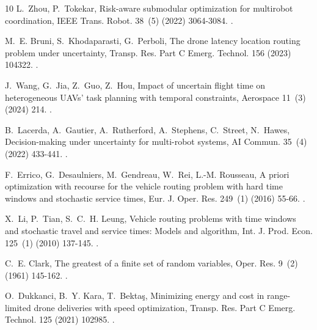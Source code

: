 \documentclass[a4paper,fleqn]{cas-dc}
\begin{document}
\begin{thebibliography}{10}
L.~Zhou, P.~Tokekar, Risk-aware submodular optimization for multirobot
  coordination, IEEE Trans. Robot. 38~(5) (2022) 3064-3084.
\newblock \href {https://doi.org/10.1109/TRO.2022.3158227}
  {}.

M.~E. Bruni, S.~Khodaparasti, G.~Perboli, The drone latency location routing
  problem under uncertainty, Transp. Res. Part C Emerg. Technol. 156 (2023)
  104322.
\newblock \href {https://doi.org/10.1016/j.trc.2023.104322}
  {}.

J.~Wang, G.~Jia, Z.~Guo, Z.~Hou, Impact of uncertain flight time on
  heterogeneous {UAVs}' task planning with temporal constraints, Aerospace
  11~(3) (2024) 214.
\newblock \href {https://doi.org/10.3390/aerospace11030214}
  {}.

B.~Lacerda, A.~Gautier, A.~Rutherford, A.~Stephens, C.~Street, N.~Hawes,
  Decision-making under uncertainty for multi-robot systems, AI Commun. 35~(4)
  (2022) 433-441.
\newblock \href {https://doi.org/10.3233/AIC-220118}
  {}.

F.~Errico, G.~Desaulniers, M.~Gendreau, W.~Rei, L.-M. Rousseau, A priori
  optimization with recourse for the vehicle routing problem with hard time
  windows and stochastic service times, Eur. J. Oper. Res. 249~(1) (2016)
  55-66.
\newblock \href {https://doi.org/10.1016/j.ejor.2015.07.027}
  {}.

X.~Li, P.~Tian, S.~C.~H. Leung, Vehicle routing problems with time windows and
  stochastic travel and service times: Models and algorithm, Int. J. Prod.
  Econ. 125~(1) (2010) 137-145.
\newblock \href {https://doi.org/10.1016/j.ijpe.2010.01.013}
  {}.

C.~E. Clark, The greatest of a finite set of random variables, Oper. Res. 9~(2)
  (1961) 145-162.
\newblock \href {https://doi.org/10.1287/opre.9.2.145}
  {}.

O.~Dukkanci, B.~Y. Kara, T.~Bekta{\c{s}}, Minimizing energy and cost in
  range-limited drone deliveries with speed optimization, Transp. Res. Part C
  Emerg. Technol. 125 (2021) 102985.
\newblock \href {https://doi.org/10.1016/j.trc.2021.102985}
  {}.


\end{thebibliography}
\end{document}

